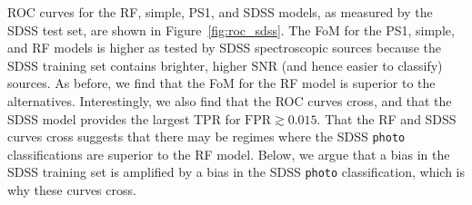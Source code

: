 \documentclass[twocolumn, dvipdfmx]{aastex62}
\begin{document}
ROC curves for the RF, simple, PS1, and SDSS models, as measured by the SDSS
test set, are shown in Figure~\ref{fig:roc_sdss}. The FoM for the PS1,
simple, and RF models is higher as tested by SDSS spectroscopic sources
because the SDSS training set contains brighter, higher SNR (and hence
easier to classify) sources. As before, we find that the FoM for the RF
model is superior to the alternatives. Interestingly, we also find that the
ROC curves cross, and that the SDSS model provides the largest TPR for
$\mathrm{FPR} \gtrsim 0.015$. That the RF and SDSS curves cross suggests
that there may be regimes where the SDSS \texttt{photo} classifications are
superior to the RF model. Below, we argue that a bias in the SDSS training
set is amplified by a bias in the SDSS \texttt{photo} classification, which
is why these curves cross.


\end{document}
